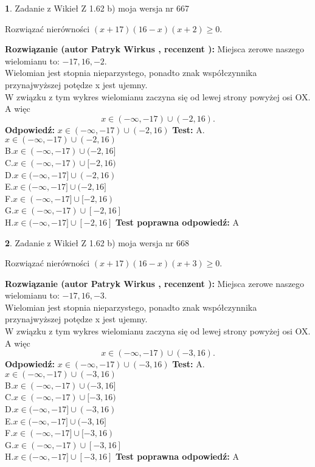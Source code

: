 \documentclass[12pt, a4paper]{article}
\theoremstyle{definition} %
\newtheorem{zad}{}
\newcommand{\zadStart}[1]{\begin{zad}#1\newline}
\newcommand{\zadStop}{\end{zad}}
\newcommand{\rozwStart}[2]{\noindent \textbf{Rozwiązanie (autor #1 , recenzent #2): }\newline}
\newcommand{\rozwStop}{\newline}
\newcommand{\odpStart}{\noindent \textbf{Odpowiedź:}\newline}
\newcommand{\odpStop}{\newline}
\newcommand{\testStart}{\noindent \textbf{Test:}\newline}
\newcommand{\testStop}{\newline}
\newcommand{\kluczStart}{\noindent \textbf{Test poprawna odpowiedź:}\newline}
\newcommand{\kluczStop}{\newline}
\begin{document}
\zadStart{Zadanie z Wikieł Z 1.62 b) moja wersja nr 667}

Rozwiązać nierówności $(x+17)(16-x)(x+2)\ge0$.
\zadStop
\rozwStart{Patryk Wirkus}{}
Miejsca zerowe naszego wielomianu to: $-17, 16, -2$.\\
Wielomian jest stopnia nieparzystego, ponadto znak współczynnika przy\linebreak najwyższej potędze x jest ujemny.\\ W związku z tym wykres wielomianu zaczyna się od lewej strony powyżej osi OX. A więc $$x \in (-\infty,-17) \cup (-2,16).$$
\rozwStop
\odpStart
$x \in (-\infty,-17) \cup (-2,16)$
\odpStop
\testStart
A.$x \in (-\infty,-17) \cup (-2,16)$\\
B.$x \in (-\infty,-17) \cup (-2,16]$\\
C.$x \in (-\infty,-17) \cup [-2,16)$\\
D.$x \in (-\infty,-17] \cup (-2,16)$\\
E.$x \in (-\infty,-17] \cup (-2,16]$\\
F.$x \in (-\infty,-17] \cup [-2,16)$\\
G.$x \in (-\infty,-17) \cup [-2,16]$\\
H.$x \in (-\infty,-17] \cup [-2,16]$
\testStop
\kluczStart
A
\kluczStop



\zadStart{Zadanie z Wikieł Z 1.62 b) moja wersja nr 668}

Rozwiązać nierówności $(x+17)(16-x)(x+3)\ge0$.
\zadStop
\rozwStart{Patryk Wirkus}{}
Miejsca zerowe naszego wielomianu to: $-17, 16, -3$.\\
Wielomian jest stopnia nieparzystego, ponadto znak współczynnika przy\linebreak najwyższej potędze x jest ujemny.\\ W związku z tym wykres wielomianu zaczyna się od lewej strony powyżej osi OX. A więc $$x \in (-\infty,-17) \cup (-3,16).$$
\rozwStop
\odpStart
$x \in (-\infty,-17) \cup (-3,16)$
\odpStop
\testStart
A.$x \in (-\infty,-17) \cup (-3,16)$\\
B.$x \in (-\infty,-17) \cup (-3,16]$\\
C.$x \in (-\infty,-17) \cup [-3,16)$\\
D.$x \in (-\infty,-17] \cup (-3,16)$\\
E.$x \in (-\infty,-17] \cup (-3,16]$\\
F.$x \in (-\infty,-17] \cup [-3,16)$\\
G.$x \in (-\infty,-17) \cup [-3,16]$\\
H.$x \in (-\infty,-17] \cup [-3,16]$
\testStop
\kluczStart
A
\kluczStop
\end{document}
